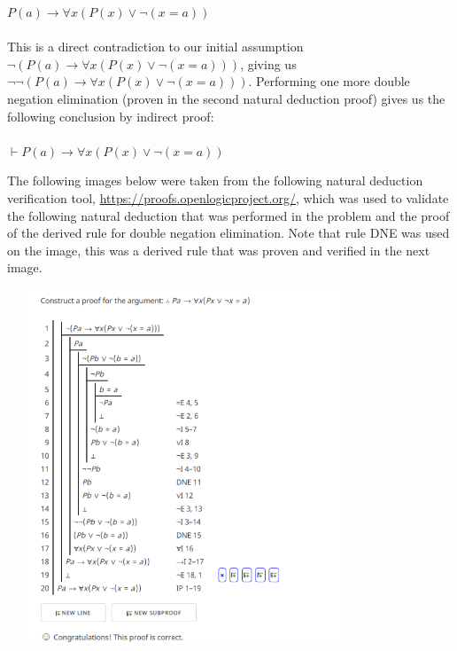 \documentclass{article}
\newcommand*\fixindent{ \hspace{1pt}\\}
\begin{document}
\hspace*{150pt}$P(a) \to \forall x(P(x) \lor \neg(x = a))$
\fixindent{}
\fixindent{}
This is a direct contradiction to our initial assumption $\neg(P(a) \to \forall x(P(x) \lor \neg(x = a)))$, giving us $\neg\neg(P(a) \to \forall x(P(x) \lor \neg(x = a)))$. Performing one more double negation elimination (proven in the second natural deduction proof) gives us the following conclusion by indirect proof:
\fixindent{}
\fixindent{}
\hspace*{150pt}$\vdash P(a)\to \forall x(P(x) \lor \neg(x = a))$
\newpage
\begin{flushleft}
The following images below were taken from the following natural deduction verification tool,  \href{https://proofs.openlogicproject.org/}{https://proofs.openlogicproject.org/}, which was used to validate the following natural deduction that was performed in the problem and the proof of the derived rule for double negation elimination. Note that rule DNE was used  on the image, this was a derived rule that was proven and verified in the next image.\\
\end{flushleft}
\begin{centering}\hspace*{1pt}\includegraphics[width=400px, height = 400px]{p2.png}\end{centering}
\newpage
\end{document}
